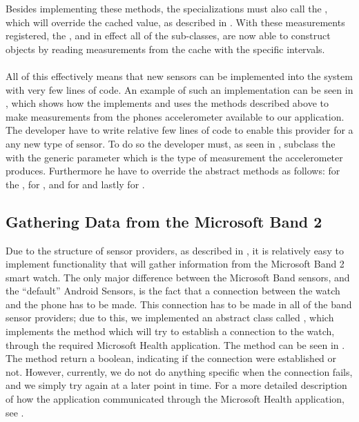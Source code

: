 Besides implementing these methods, the specializations must also call the , which will override the cached value, as described in . With these measurements registered, the , and in effect all of the sub-classes, are now able to construct  objects by reading measurements from the cache with the specific intervals. 
\\\\
All of this effectively means that new sensors can be implemented into the system with very few lines of code. An example of such an implementation can be seen in , which shows how the  implements and uses the methods described above to make measurements from the phones accelerometer available to our application. The developer have to write relative few lines of code to enable this provider for a any new type of sensor. To do so the developer must, as seen in , subclass the  with the generic parameter  which is the type of measurement the accelerometer produces. Furthermore he have to override the abstract methods as follows:  for the ,  for ,  and  for  and lastly  for .


\FloatBarrier

\subsection{Gathering Data from the Microsoft Band 2}
Due to the structure of sensor providers, as described in , it is relatively easy to implement functionality that will gather information from the Microsoft Band 2 smart watch. The only major difference between the Microsoft Band sensors, and the ``default'' Android Sensors, is the fact that a connection between the watch and the phone has to be made. This connection has to be made in all of the band sensor providers; due to this, we implemented an abstract class called , which implements the method  which will try to establish a connection to the watch, through the required Microsoft Health application. The method can be seen in . The method return a boolean, indicating if the connection were established or not. However, currently, we do not do anything specific when the connection fails, and we simply try again at a later point in time. For a more detailed description of how the application communicated through the Microsoft Health application, see .


\FloatBarrier
